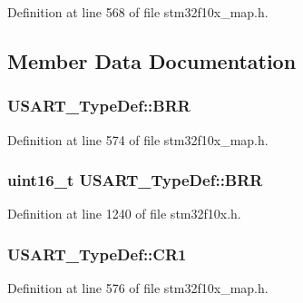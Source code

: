 Definition at line 568 of file stm32f10x\+\_\+map.\+h.



\subsection{Member Data Documentation}
\subsubsection[{\texorpdfstring{B\+RR}{BRR}}]{ U\+S\+A\+R\+T\+\_\+\+Type\+Def\+::\+B\+RR}\hypertarget{struct_u_s_a_r_t___type_def_aaef1456e1f34619538a82e7847f0ed4a}{}\label{struct_u_s_a_r_t___type_def_aaef1456e1f34619538a82e7847f0ed4a}


Definition at line 574 of file stm32f10x\+\_\+map.\+h.

\subsubsection[{\texorpdfstring{B\+RR}{BRR}}]{ {\bf uint16\+\_\+t} U\+S\+A\+R\+T\+\_\+\+Type\+Def\+::\+B\+RR}\hypertarget{struct_u_s_a_r_t___type_def_a2044eb2a0a8a731400d309741bceb2f7}{}\label{struct_u_s_a_r_t___type_def_a2044eb2a0a8a731400d309741bceb2f7}


Definition at line 1240 of file stm32f10x.\+h.

\subsubsection[{\texorpdfstring{C\+R1}{CR1}}]{ U\+S\+A\+R\+T\+\_\+\+Type\+Def\+::\+C\+R1}\hypertarget{struct_u_s_a_r_t___type_def_add7776b5be090fa5412ba86489349737}{}\label{struct_u_s_a_r_t___type_def_add7776b5be090fa5412ba86489349737}


Definition at line 576 of file stm32f10x\+\_\+map.\+h.

